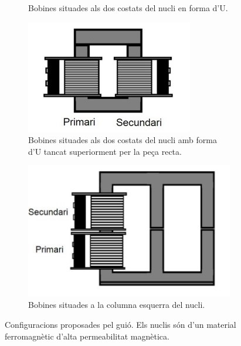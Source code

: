 \documentclass[a4paper,10.5pt]{report}
\begin{document}
\begin{figure}[h]
\begin{subfigure}[b]{0.22\textwidth}
		\caption{Bobines situades als dos costats del nucli en forma d'U.}
		\label{fig4:2b}
	\end{subfigure}
	\hspace{0.4cm}
	\begin{subfigure}[b]{0.22\textwidth}
		\centering
		\includegraphics[width=\textwidth]{42c.jpg}
		\caption{Bobines situades als dos costats del nucli amb forma d'U tancat superiorment per la peça recta.}
		\label{fig4:2c}
	\end{subfigure}
	\hspace{0.4cm}
	\begin{subfigure}[b]{0.22\textwidth}
		\centering
		\includegraphics[width=\textwidth]{42d.jpg}
		\caption{Bobines situades a la columna esquerra del nucli.}
		\label{fig4:2d}
	\end{subfigure}
	\caption{Configuracions proposades pel guió. Els nuclis són d'un material ferromagnètic d'alta permeabilitat magnètica.}
	\label{fig4:2}
\end{figure}
\end{document}
